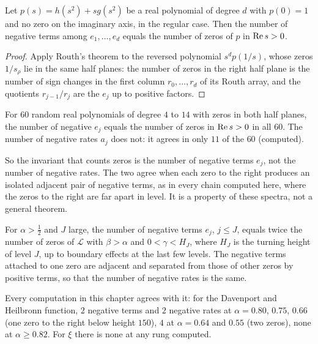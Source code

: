 \begin{proposition}\label{h:prop:routh}
Let $p(s)=h(s^2)+sg(s^2)$ be a real polynomial of degree $d$ with $p(0)=1$ and no zero on the imaginary axis, in the regular case. Then the number of negative terms among $e_1,\dots,e_d$ equals the number of zeros of $p$ in $\operatorname{Re} s>0$.
\end{proposition}

\begin{proof}
Apply Routh's theorem \cite{Gantmacher59} to the reversed polynomial $s^dp(1/s)$, whose zeros $1/s_\rho$ lie in the same half planes: the number of zeros in the right half plane is the number of sign changes in the first column $r_0,\dots,r_d$ of its Routh array, and the quotients $r_{j-1}/r_j$ are the $e_j$ up to positive factors.
\end{proof}

\begin{computation}\label{h:comp:routh}
For $60$ random real polynomials of degree $4$ to $14$ with zeros in both half planes, the number of negative $e_j$ equals the number of zeros in $\operatorname{Re} s>0$ in all $60$. The number of negative rates $a_j$ does not: it agrees in only $11$ of the $60$ (computed). %
\end{computation}

So the invariant that counts zeros is the number of negative terms $e_j$, not the number of negative rates. The two agree when each zero to the right produces an isolated adjacent pair of negative terms, as in every chain computed here, where the zeros to the right are far apart in level. It is a property of these spectra, not a general theorem.

\begin{conjecture}\label{h:conj:count}
For $\alpha>\frac12$ and $J$ large, the number of negative terms $e_j$, $j\le J$, equals twice the number of zeros of $\mathcal L$ with $\beta>\alpha$ and $0<\gamma<H_J$, where $H_J$ is the turning height of level $J$, up to boundary effects at the last few levels. The negative terms attached to one zero are adjacent and separated from those of other zeros by positive terms, so that the number of negative rates is the same.
\end{conjecture}

Every computation in this chapter agrees with it: for the Davenport and Heilbronn function, $2$ negative terms and $2$ negative rates at $\alpha=0.80$, $0.75$, $0.66$ (one zero to the right below height $150$), $4$ at $\alpha=0.64$ and $0.55$ (two zeros), none at $\alpha\ge0.82$. For $\xi$ there is none at any rung computed.

